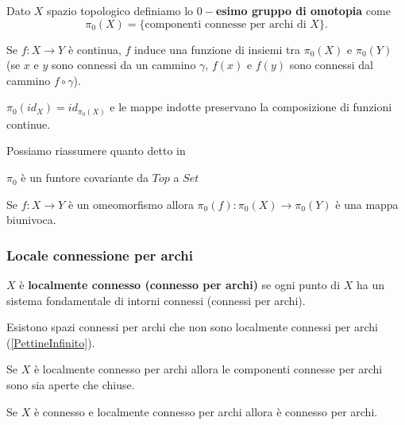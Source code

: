 \begin{multicols*}{2}
\begin{definition}
Dato $X$ spazio topologico definiamo lo \textbf{$0-$esimo gruppo di omotopia} come
\[\pi_0(X)=\{\text{componenti connesse per archi di }X\}.\]
\end{definition}

\begin{remark}
Se $f:X\to Y$ è continua, $f$ induce una funzione di insiemi tra $\pi_0(X)$ e $\pi_0(Y)$ (se $x$ e $y$ sono connessi da un cammino $\gamma$, $f(x)$ e $f(y)$ sono connessi dal cammino $f\circ \gamma$).
\end{remark}
\begin{remark}
$\pi_0(id_X)=id_{\pi_0(X)}$
e le mappe indotte preservano la composizione di funzioni continue.
\end{remark}

Possiamo riassumere quanto detto in
\begin{fact}\label{Pi0EFuntoreDaTopASet}
$\pi_0$ è un funtore covariante da $Top$ a $Set$
\end{fact}
\begin{remark}
Se $f:X\to Y$ è un omeomorfismo allora $\pi_0(f):\pi_0(X)\to\pi_0(Y)$ è una mappa biunivoca.
\end{remark}

\subsubsection{Locale connessione per archi}
\begin{definition}
$X$ è \textbf{localmente connesso (connesso per archi)} se ogni punto di $X$ ha un sistema fondamentale di intorni connessi  (connessi per archi).
\end{definition}
\begin{remark}
Esistono spazi connessi per archi che non sono localmente connessi per archi (\ref{PettineInfinito}).
\end{remark}

\begin{proposition}\label{ComponentiConnessePerArchiInLocalmenteConnessoPerArchiSonoAperteEChiuse}
Se $X$ è localmente connesso per archi allora le componenti connesse per archi sono sia aperte che chiuse.
\end{proposition}

\begin{theorem}\label{ConnessoLocalmenteConnessoPerArchiEConnessoPerArchi}
Se $X$ è connesso e  localmente connesso per archi allora è connesso per archi.
\end{theorem}


\end{multicols*}
